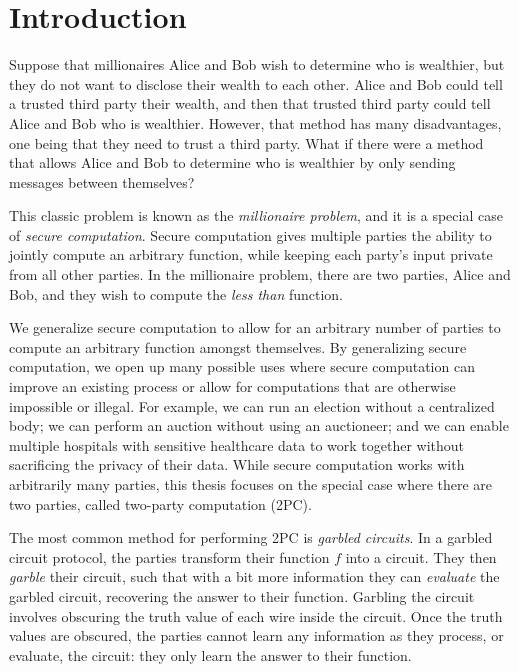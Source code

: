 

\chapter*{Introduction}

Suppose that millionaires Alice and Bob wish to determine who is wealthier, but they do not want to disclose their wealth to each other.
Alice and Bob could tell a trusted third party their wealth, and then that trusted third party could tell Alice and Bob who is wealthier.
However, that method has many disadvantages, one being that they need to trust a third party.
What if there were a method that allows Alice and Bob to determine who is wealthier by only sending messages between themselves?

This classic problem is known as the \textit{millionaire problem}, and it is a special case of \textit{secure computation}.
Secure computation gives multiple parties the ability to jointly compute an arbitrary function, while keeping each party's input private from all other parties.
In the millionaire problem, there are two parties, Alice and Bob, and they wish to compute the \textit{less than} function.

We generalize secure computation to allow for an arbitrary number of parties to compute an arbitrary function amongst themselves. 
By generalizing secure computation, we open up many possible uses where secure computation can improve an existing process or allow for computations that are otherwise impossible or illegal. 
For example, we can run an election without a centralized body; we can perform an auction without using an auctioneer; and we can enable multiple hospitals with sensitive healthcare data to work together without sacrificing the privacy of their data.
While secure computation works with arbitrarily many parties, this thesis focuses on the special case where there are two parties, called two-party computation (2PC).

The most common method for performing 2PC is \textit{garbled circuits}.
In a garbled circuit protocol, the parties transform their function $f$ into a circuit. 
They then \textit{garble} their circuit, such that with a bit more information they can \textit{evaluate} the garbled circuit, recovering the answer to their function.
Garbling the circuit involves obscuring the truth value of each wire inside the circuit.
Once the truth values are obscured, the parties cannot learn any information as they process, or evaluate, the circuit: they only learn the answer to their function.

